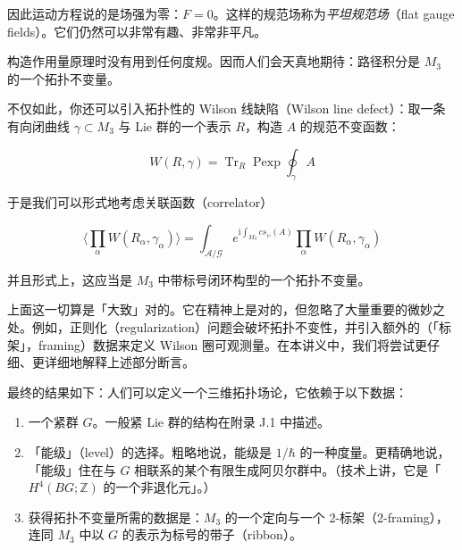 因此运动方程说的是场强为零：$F=0$。这样的规范场称为\emph{平坦规范场}（flat gauge fields）。它们仍然可以非常有趣、非常非平凡。

构造作用量原理时没有用到任何度规。因而人们会天真地期待：路径积分是 $M_3$ 的一个拓扑不变量。

不仅如此，你还可以引入拓扑性的 Wilson 线缺陷（Wilson line defect）：取一条有向闭曲线 $\gamma\subset M_3$ 与 Lie 群的一个表示 $R$，构造 $A$ 的规范不变函数：

\begin{equation}
  W(R,\gamma)=\operatorname{Tr}_R\operatorname{Pexp}\oint_{\gamma}A
  \tag{1.7}
  \label{eq:1.7}
\end{equation}

于是我们可以形式地考虑关联函数（correlator）

\begin{equation}
  \Big\langle\prod_{\alpha}W(R_\alpha,\gamma_\alpha)\Big\rangle
  =\int_{\mathcal{A}/\mathcal{G}} e^{\mathrm{i}\int_{M_3}cs_\wp(A)}\prod_{\alpha}W(R_\alpha,\gamma_\alpha)
  \tag{1.8}
  \label{eq:1.8}
\end{equation}

并且形式上，这应当是 $M_3$ 中带标号闭环构型的一个拓扑不变量。

上面这一切算是「大致」对的。它在精神上是对的，但忽略了大量重要的微妙之处。例如，正则化（regularization）问题会破坏拓扑不变性，并引入额外的（「标架」，framing）数据来定义 Wilson 圈可观测量。在本讲义中，我们将尝试更仔细、更详细地解释上述部分断言。


最终的结果如下：人们可以定义一个三维拓扑场论，它依赖于以下数据：

\begin{enumerate}
  \item 一个紧群 $G$。一般紧 Lie 群的结构在附录 J.1 中描述。
  \item 「能级」（level）的选择。粗略地说，能级是 $1/\hbar$ 的一种度量。更精确地说，「能级」住在与 $G$ 相联系的某个有限生成阿贝尔群中。（技术上讲，它是「$H^4(BG;\mathbb{Z})$ 的一个非退化元」。）
  \item 获得拓扑不变量所需的数据是：$M_3$ 的一个定向与一个 2-标架（2-framing），连同 $M_3$ 中以 $G$ 的表示为标号的带子（ribbon）。
\end{enumerate}

